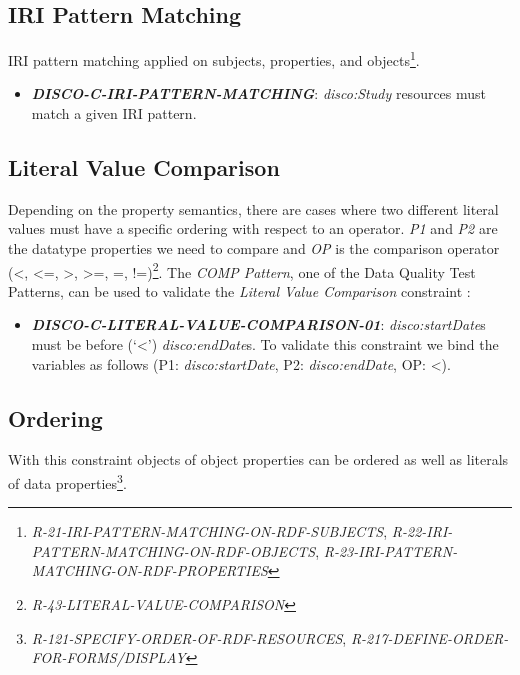 \documentclass{llncs}
\begin{document}
\subsection{IRI Pattern Matching}

IRI pattern matching applied on subjects, properties, and objects\footnote{\emph{R-21-IRI-PATTERN-MATCHING-ON-RDF-SUBJECTS}, \emph{R-22-IRI-PATTERN-MATCHING-ON-RDF-OBJECTS}, \emph{R-23-IRI-PATTERN-MATCHING-ON-RDF-PROPERTIES}}.

\begin{itemize}
	\item \textbf{{\em DISCO-C-IRI-PATTERN-MATCHING}}: \emph{disco:Study} resources must match a given IRI pattern.
\end{itemize}

\subsection{Literal Value Comparison}

Depending on the property semantics,
there are cases where two different literal values must have
a specific ordering with respect to an operator. 
\emph{P1} and \emph{P2} are the datatype properties we need to compare and 
\emph{OP} is the comparison operator (\textless, \textless=, \textgreater, \textgreater=, =, !=)\footnote{{\em R-43-LITERAL-VALUE-COMPARISON}}.
The {\em COMP Pattern}, one of the Data Quality Test Patterns, can be used to validate the {\em Literal Value Comparison} constraint \cite{Kontokostas2014}:


\begin{itemize}
	\item \textbf{{\em DISCO-C-LITERAL-VALUE-COMPARISON-01}}:
{\em disco:startDate}s must be before (‘\textless’) {\em disco:endDate}s.
To validate this constraint we bind the variables as follows (P1: {\em disco:startDate}, P2: {\em disco:endDate}, OP: \textless). 
\end{itemize}

\subsection{Ordering}

With this constraint objects of object properties can be ordered as well as literals of data properties\footnote{\emph{R-121-SPECIFY-ORDER-OF-RDF-RESOURCES}, \emph{R-217-DEFINE-ORDER-FOR-FORMS/DISPLAY}}.
\end{document}

